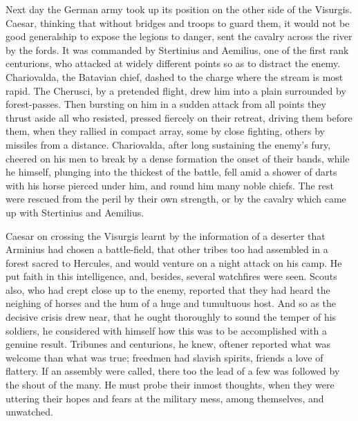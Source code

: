 
Next day the German army took up its position on the other side of the Visurgis. Caesar, thinking that without bridges and troops to guard them, it would not be good generalship to expose the legions to danger, sent the cavalry across the river by the fords. It was commanded by Stertinius and Aemilius, one of the first rank centurions, who attacked at widely different points so as to distract the enemy. Chariovalda, the Batavian chief, dashed to the charge where the stream is most rapid. The Cherusci, by a pretended flight, drew him into a plain surrounded by forest-passes. Then bursting on him in a sudden attack from all points they thrust aside all who resisted, pressed fiercely on their retreat, driving them before them, when they rallied in compact array, some by close fighting, others by missiles from a distance. Chariovalda, after long sustaining the enemy's fury, cheered on his men to break by a dense formation the onset of their bands, while he himself, plunging into the thickest of the battle, fell amid a shower of darts with his horse pierced under him, and round him many noble chiefs. The rest were rescued from the peril by their own strength, or by the cavalry which came up with Stertinius and Aemilius.


Caesar on crossing the Visurgis learnt by the information of a deserter that Arminius had chosen a battle-field, that other tribes too had assembled in a forest sacred to Hercules, and would venture on a night attack on his camp. He put faith in this intelligence, and, besides, several watchfires were seen. Scouts also, who had crept close up to the enemy, reported that they had heard the neighing of horses and the hum of a huge and tumultuous host. And so as the decisive crisis drew near, that he ought thoroughly to sound the temper of his soldiers, he considered with himself how this was to be accomplished with a genuine result. Tribunes and centurions, he knew, oftener reported what was welcome than what was true; freedmen had slavish spirits, friends a love of flattery. If an assembly were called, there too the lead of a few was followed by the shout of the many. He must probe their inmost thoughts, when they were uttering their hopes and fears at the military mess, among themselves, and unwatched.


